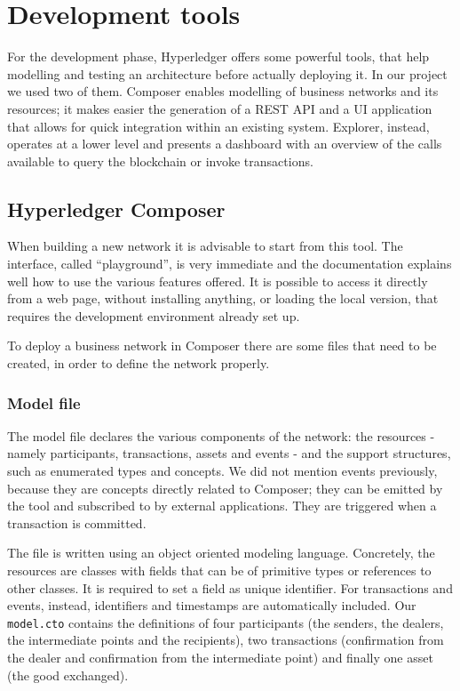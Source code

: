 \section{Development tools}
\label{sec:dev_tools}
For the development phase, Hyperledger offers some powerful tools, that help modelling and testing an architecture before actually deploying it. In our project we used two of them. Composer enables modelling of business networks and its resources; it makes easier the generation of a REST API and a UI application that allows for quick integration within an existing system. Explorer, instead, operates at a lower level and presents a dashboard with an overview of the calls available to query the blockchain or invoke transactions.

\subsection{Hyperledger Composer}
\label{sec:composer}
When building a new network it is advisable to start from this tool. The interface, called ``playground'', is very immediate and the documentation explains well how to use the various features offered. It is possible to access it directly from a web page, without installing anything, or loading the local version, that requires the development environment already set up. 

To deploy a business network in Composer there are some files that need to be created, in order to define the network properly.

\subsubsection{Model file}
The model file declares the various components of the network: the resources - namely participants, transactions, assets and events - and the support structures, such as enumerated types and concepts. We did not mention events previously, because they are concepts directly related to Composer; they can be emitted by the tool and subscribed to by external applications. They are triggered when a transaction is committed.

The file is written using an object oriented modeling language. Concretely, the resources are classes with fields that can be of primitive types or references to other classes. It is required to set a field as unique identifier. For transactions and events, instead, identifiers and timestamps are automatically included. Our \texttt{model.cto} contains the definitions of four participants (the senders, the dealers, the intermediate points and the recipients), two transactions (confirmation from the dealer and confirmation from the intermediate point) and finally one asset (the good exchanged).

